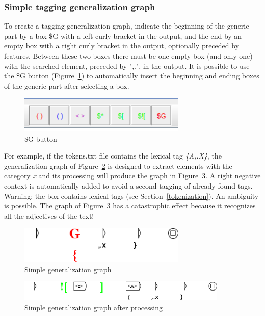 \subsubsection{Simple tagging generalization graph}

\noindent To create a tagging generalization graph, indicate the beginning of the generic part by a box \$G
with a left curly bracket in the output, and the end by an empty box with a right curly bracket in the output,
optionally preceded by features. Between these two boxes there must be one empty box (and only one)
with the searched element, preceded by ",.", in the output.
It is possible to use the \$G button (Figure~\ref{fig:bouton_g}) to automatically insert the beginning and
ending boxes of the generic part after selecting a box.

\begin{figure}[!htb]
  \centering
  \includegraphics[width=8cm]{resources/img/bouton_g.png}
  \caption{\$G button}
  \label{fig:bouton_g}
\end{figure}

\bigskip
\noindent For example, if the tokens.txt file contains the lexical tag \emph{\{A,.X\}}, the generalization graph of
Figure~\ref{fig:graphe_generique_simple} is designed to extract elements with the category \textit{x}
and its processing will produce the graph in Figure~\ref{fig:graphe_generique_simple_genere}. A right
negative context is automatically added to avoid a second tagging of already found tags. Warning:
the box contains lexical tags (see Section~\ref{tokenization}). An ambiguity is possible. The graph
of Figure~\ref{fig:graphe_generique_simple_genere} has a catastrophic effect because it recognizes
all the adjectives of the text!

\begin{figure}[!htb]
  \centering
  \includegraphics[width=8cm]{resources/img/graphe_generique_simple.png}
  \caption{Simple generalization graph}
  \label{fig:graphe_generique_simple}
\end{figure}

\begin{figure}[!htb]
  \centering
  \includegraphics[width=10cm]{resources/img/graphe_generique_simple_genere.png}
  \caption{Simple generalization graph after processing}
  \label{fig:graphe_generique_simple_genere}
\end{figure}

